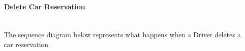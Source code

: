 \documentclass{article}
\begin{document}
				\pagebreak
				\paragraph{Delete Car Reservation} \mbox{}\\
				The sequence diagram below represents what happens when a Driver deletes a car reservation.\\ \begin{minipage}{\linewidth}
					\vspace{5mm}
					\vspace{5mm}
				\end{minipage}
				
			\pagebreak
\end{document}
